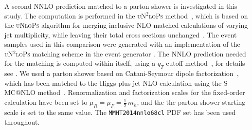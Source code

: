 \subsubsection{\Sherpa \NNLOPS}
\label{sec:hjetscomp:tools:nnlops:sherpa}

A second NNLO prediction matched to a parton shower is investigated 
in this study. The computation is performed in the \textsc{uN$^2$loPs} 
method~\cite{Hoeche:2014aia,Hoche:2014dla}, which is based on the 
\textsc{uNloPs} algorithm for merging inclusive NLO matched calculations 
of varying jet multiplicity, while leaving their total cross sections 
unchanged~\cite{Lonnblad:2012ix,Lonnblad:2012ng}. The event samples 
used in this comparison were generated with an implementation of the 
\textsc{uN$^2$loPs} matching scheme in the event generator \Sherpa. The 
NNLO prediction needed for the matching is computed within \Sherpa itself, 
using a $q_T$ cutoff method~\cite{Gao:2012ja}, for details see 
\cite{Hoeche:2014aia,Hoche:2014dla}. We used a parton shower based 
on Catani-Seymour dipole factorization~\cite{Schumann:2007mg,Hoeche:2009xc},
which has been matched to the Higgs plus jet NLO calculation using 
the S-MC@NLO method~\cite{Hoeche:2011fd,Hoeche:2012ft}. Renormalization 
and factorization scales for the fixed-order calculation have been 
set to $\mu_R = \mu_F = \tfrac{1}{2}\,m_h$, and the the parton shower 
starting scale is set to the same value. The \texttt{MMHT2014nnlo68cl} 
PDF set \cite{Harland-Lang:2014zoa} has been used throughout.
